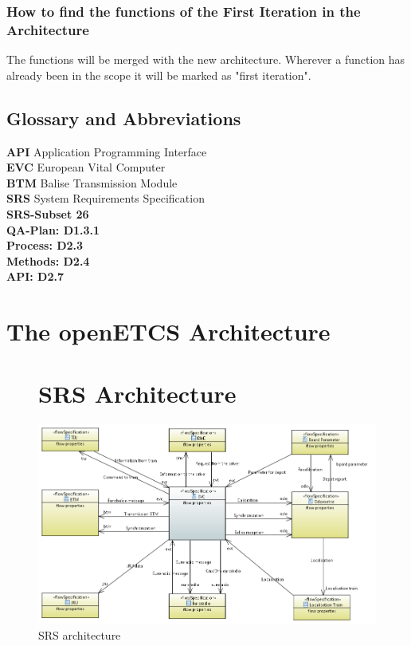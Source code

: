 \documentclass{template/openetcs_report}
\begin{document}
\subsection{How to find the functions of the First Iteration in the Architecture}
The functions will be merged with the new architecture. Wherever a function has already been in the scope it will be marked as "first iteration".

\section{Glossary and Abbreviations}

\textbf{API} Application Programming Interface\\
\textbf{EVC} European Vital Computer\\
\textbf{BTM} Balise Transmission Module\\
\textbf{SRS} System Requirements Specification\\


\textbf{SRS-Subset 26}\\
\textbf{QA-Plan: D1.3.1}\\
\textbf{Process: D2.3}\\
\textbf{Methods: D2.4}\\
\textbf{API: D2.7}\\

\chapter{The openETCS Architecture}


\begin{figure}[hbtp]
\chapter{SRS Architecture}
\centering
\includegraphics[angle=90, scale=0.9] {images/HighLevelArchitecture.png}
\caption{SRS architecture}
\end{figure}
\end{document}
